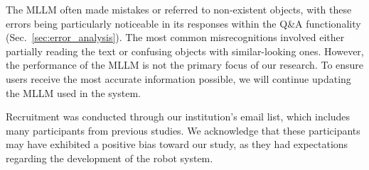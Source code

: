 The MLLM often made mistakes or referred to non-existent objects, with these errors being particularly noticeable in its responses within the Q\&A functionality (Sec.~\ref{sec:error_analysis}). 
The most common misrecognitions involved either partially reading the text or confusing objects with similar-looking ones. 
However, the performance of the MLLM is not the primary focus of our research. 
To ensure users receive the most accurate information possible, we will continue updating the MLLM used in the system.

Recruitment was conducted through our institution's email list, which includes many participants from previous studies. 
We acknowledge that these participants may have exhibited a positive bias toward our study, as they had expectations regarding the development of the robot system.
